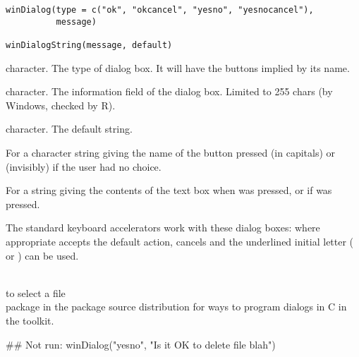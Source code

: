 %
\begin{Usage}
\begin{verbatim}
winDialog(type = c("ok", "okcancel", "yesno", "yesnocancel"),
          message)

winDialogString(message, default)
\end{verbatim}
\end{Usage}
%
\begin{Arguments}
\begin{ldescription}
\item[\code{type}] character. The type of dialog box. It will have the
buttons implied by its name.
\item[\code{message}] character. The information field of the dialog
box. Limited to 255 chars (by Windows, checked by R).
\item[\code{default}] character. The default string.
\end{ldescription}
\end{Arguments}
%
\begin{Value}
For  a character string giving the name of the button
pressed (in capitals) or  (invisibly) if the user had no
choice.

For  a string giving the contents of the text
box when  was pressed, or  if  was pressed.
\end{Value}
%
\begin{Note}\relax
The standard keyboard accelerators work with these dialog boxes:
where appropriate  accepts the default action,
 cancels and the underlined initial letter ( or
) can be used.
\end{Note}
%
\begin{SeeAlso}\relax
{}\\{}
 to select a file\\{}
package  in the package source distribution for ways to
program dialogs in C in the  toolkit.
\end{SeeAlso}
%
\begin{Examples}
\begin{ExampleCode}
## Not run: winDialog("yesno", "Is it OK to delete file blah")
\end{ExampleCode}
\end{Examples}
